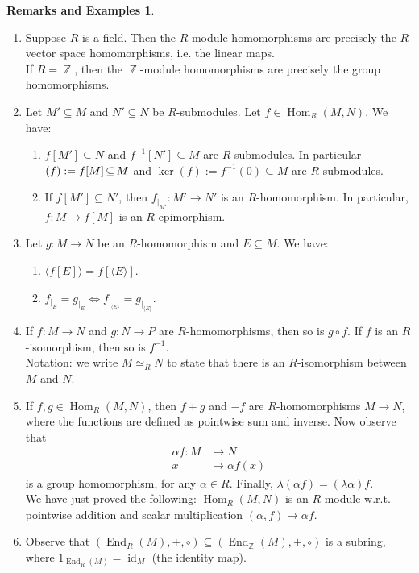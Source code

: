 \documentclass[12pt,a4paper]{report}
\theoremstyle{definition}
\newtheorem*{remex}{Remarks and Examples}
\theoremstyle{num.custom-title}
\DeclareMathOperator{\id}{id}
\let\o\relax %
\DeclareMathOperator{\o}{\mathsf{o}}
\let\Im\relax %
\DeclareMathOperator{\Im}{Im}
\DeclareMathOperator{\Hom}{Hom}
\DeclareMathOperator{\End}{End}
\DeclareMathOperator{\Z}{\mathbb{Z}}
\DeclareMathOperator{\sse}{\subseteq}
\renewcommand{\iff}{\Leftrightarrow}
\begin{document}
\begin{remex}\ 
\begin{enumerate}
\item Suppose $R$ is a field. Then the $R$-module homomorphisms are precisely the $R$-vector space homomorphisms, i.e. the linear maps.\\
If $R=\Z$, then the $\Z$-module homomorphisms are precisely the group homomorphisms.\label{Z-hom=goup_hom}
\item Let $M' \sse M$ and $N' \sse N$ be $R$-submodules. Let $f \in \Hom_R(M,N)$. We have:
\begin{enumerate}
\item $f[M'] \sse N$ and $f^{-1}[N'] \sse M$ are $R$-submodules. In particular $\Im(f) := f[M] \sse M$ and $\ker(f) := f^{-1}(0) \sse M$ are $R$-submodules.
\item If $f[M'] \sse N'$, then $f_{|_{M'}} : M' \to N'$ is an $R$-homomorphism. In particular, $f : M \to f[M]$ is an $R$-epimorphism.
\end{enumerate}
\item Let $g : M \to N$ be an $R$-homomorphism and $E \sse M$. We have:
\begin{enumerate}
\item $\langle f[E] \rangle = f[ \langle E \rangle ]$.
\item $f_{|_E} = g_{|_E} \iff f_{|_{\langle E \rangle}} = g_{|_{\langle E \rangle}}$.
\end{enumerate}
\item If $f: M \to N$ and $g: N \to P$ are $R$-homomorphisms, then so is $g \circ f$. If $f$ is an $R$-isomorphism, then so is $f^{-1}$.\\
Notation: we write $M \simeq_R N$ to state that there is an $R$-isomorphism between $M$ and $N$.
\item If $f,g \in \Hom_R(M,N)$, then $f+g$ and $-f$ are $R$-homomorphisms $M \to N$, where the functions are defined as pointwise sum and inverse. Now observe that
\begin{align*}
\alpha f : M &\to N \\
x &\mapsto \alpha f(x)
\end{align*}
is a group homomorphism, for any $\alpha \in R$. Finally, $\lambda (\alpha f) = (\lambda \alpha) f$.\\
We have just proved the following: $\Hom_R(M,N)$ is an $R$-module w.r.t. pointwise addition and scalar multiplication $(\alpha,f) \mapsto \alpha f$.
\item Observe that $(\End_R(M),+,\circ) \sse (\End_{\Z}(M),+,\circ)$ is a subring, where $1_{\End_R(M)} = \id_M$ (the identity map).
\end{enumerate}
\end{remex}
\end{document}
